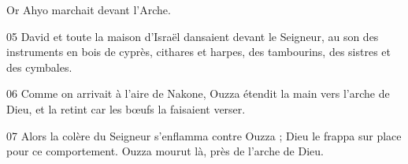 
 Or Ahyo marchait devant l’Arche.

05 David et toute la maison d’Israël dansaient devant le Seigneur, au son des instruments en bois de cyprès, cithares et harpes, des tambourins, des sistres et des cymbales.

06 Comme on arrivait à l’aire de Nakone, Ouzza étendit la main vers l’arche de Dieu, et la retint car les bœufs la faisaient verser.

07 Alors la colère du Seigneur s’enflamma contre Ouzza ; Dieu le frappa sur place pour ce comportement. Ouzza mourut là, près de l’arche de Dieu.
